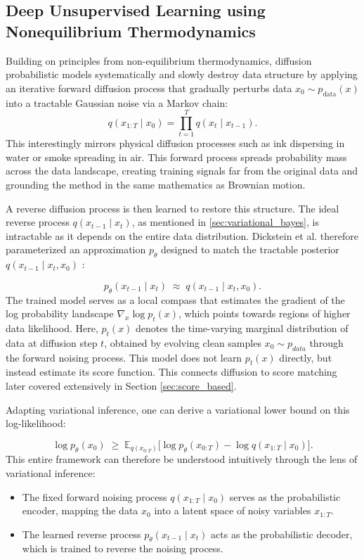 \subsection{Deep Unsupervised Learning using Nonequilibrium Thermodynamics}
Building on principles from non-equilibrium thermodynamics, diffusion probabilistic models systematically and slowly destroy data structure by applying an iterative forward diffusion process that gradually perturbs data $x_0 \sim p_{\text{data}}(x)$ into a tractable Gaussian noise via a Markov chain:
\begin{equation}
	q(x_{1:T} \mid x_0) = \prod_{t=1}^T q(x_t \mid x_{t-1}).
\end{equation}
This interestingly mirrors physical diffusion processes such as ink dispersing in water or smoke spreading in air. This forward process spreads probability mass across the data landscape, creating training signals far from the original data and grounding the method in the same mathematics as Brownian motion.

A reverse diffusion process is then learned to restore this structure. The ideal reverse process $q(x_{t-1} \mid x_t)$, as mentioned in \ref{sec:variational_bayes}, is intractable as it depends on the entire data distribution. Dickstein et al. therefore parameterized an approximation $p_{\theta}$ designed to match the tractable posterior $q(x_{t-1} \mid x_t, x_0)$ \cite{sohl-dicksteinDeepUnsupervisedLearning2015a}:

\begin{equation}
	p_\theta(x_{t-1} \mid x_t) \;\approx\; q(x_{t-1} \mid x_t, x_0).
\end{equation}
The trained model serves as a local compass that estimates the gradient of the log probability landscape  $\nabla_x \log p_t(x)$, which points towards regions of higher data likelihood. Here, $p_t(x)$  denotes the time-varying marginal distribution of data at diffusion step $t$, obtained by evolving clean samples $x_0 \sim p_{data}$ through the forward noising process. This model does not learn $p_t(x)$ directly, but instead estimate its score function. This connects diffusion to score matching later covered extensively in Section \ref{sec:score_based}.

Adapting variational inference, one can derive a variational lower bound on this log-likelihood:

\begin{equation}
	\log p_{\theta}(x_0) \;\geq\; \mathbb{E}_{q(x_{0:T})} \Big[ \log p_{\theta}(x_{0:T}) - \log q(x_{1:T}\mid x_0) \Big].
\end{equation}
This entire framework can therefore be understood intuitively through the lens of variational inference:
\begin{itemize}
	\item The fixed forward noising process $q(x_{1:T} \mid x_0)$ serves as the probabilistic encoder, mapping the data $x_0$ into a latent space of noisy variables $x_{1:T}$.
	\item The learned reverse process $p_{\theta}(x_{t-1} \mid x_{t})$ acts as the probabilistic decoder, which is trained to reverse the noising process.
\end{itemize}



